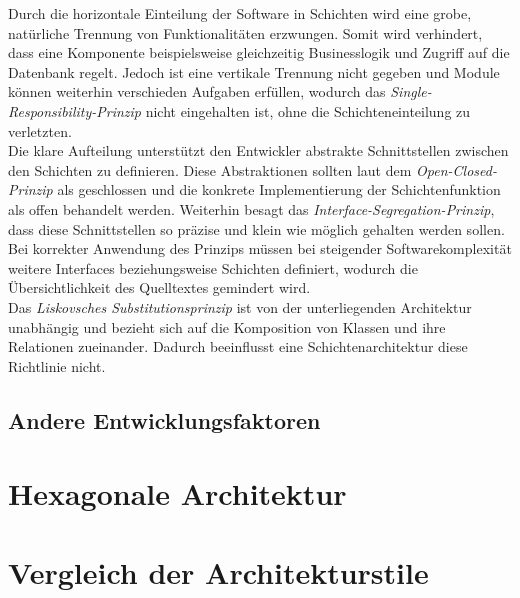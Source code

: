 \documentclass[conference]{IEEEtran}
\begin{document}
Durch die horizontale Einteilung der Software in Schichten wird eine grobe, natürliche Trennung von Funktionalitäten erzwungen. Somit wird verhindert, dass eine Komponente beispielsweise gleichzeitig Businesslogik und Zugriff auf die Datenbank regelt. Jedoch ist eine vertikale Trennung nicht gegeben und Module können weiterhin verschieden Aufgaben erfüllen, wodurch das \emph{Single-Responsibility-Prinzip} nicht eingehalten ist, ohne die Schichteneinteilung zu verletzten. \\

Die klare Aufteilung unterstützt den Entwickler abstrakte Schnittstellen zwischen den Schichten zu definieren. Diese Abstraktionen sollten laut dem \emph{Open-Closed-Prinzip} als geschlossen und die konkrete Implementierung der Schichtenfunktion als offen behandelt werden. Weiterhin besagt das \emph{Interface-Segregation-Prinzip}, dass diese Schnittstellen so präzise und klein wie möglich gehalten werden sollen. Bei korrekter Anwendung des Prinzips müssen bei steigender Softwarekomplexität weitere Interfaces beziehungsweise Schichten definiert, wodurch die Übersichtlichkeit des Quelltextes gemindert wird. \\

Das \emph{Liskovsches Substitutionsprinzip} ist von der unterliegenden Architektur unabhängig und bezieht sich auf die Komposition von Klassen und ihre Relationen zueinander. Dadurch beeinflusst eine Schichtenarchitektur diese Richtlinie nicht. \\






\subsection{Andere Entwicklungsfaktoren}


\section{Hexagonale Architektur}

\section{Vergleich der Architekturstile}
 

\printbibliography
\end{document}

